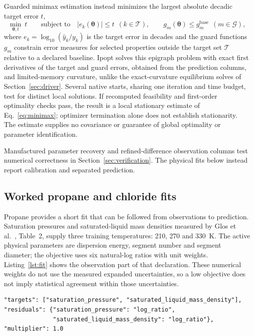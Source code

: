 Guarded minimax estimation instead minimizes the largest absolute decadic target error $t$,
\begin{equation}
\min_{\boldsymbol\theta,t}\ t\qquad\text{subject to}\quad \lvert e_k(\boldsymbol\theta)\rvert\le t\ \ (k\in\mathcal{T}),\qquad g_m(\boldsymbol\theta)\le g_m^{\mathrm{base}}\ \ (m\in\mathcal{G}),
\label{eq:minimax}
\end{equation}
where $e_k=\log_{10}(\hat y_k/y_k)$ is the target error in decades and the guard functions $g_m$ constrain error measures for selected properties outside the target set $\mathcal{T}$ relative to a declared baseline.
Ipopt solves this epigraph problem with exact first derivatives of the target and guard errors, obtained from the prediction columns, and limited-memory curvature, unlike the exact-curvature equilibrium solves of Section~\ref{sec:driver}.
Several native starts, sharing one iteration and time budget, test for distinct local solutions.
If recomputed feasibility and first-order optimality checks pass, the result is a local stationary estimate of Eq.~\eqref{eq:minimax}; optimizer termination alone does not establish stationarity.
The estimate supplies no covariance or guarantee of global optimality or parameter identification.

Manufactured parameter recovery and refined-difference observation columns test numerical correctness in Section~\ref{sec:verification}.
The physical fits below instead report calibration and separated prediction.




\subsection{Worked propane and chloride fits}
Propane provides a short fit that can be followed from observations to prediction.
Saturation pressures and saturated-liquid mass densities measured by Glos et al.~\citep{Glos2004}, Table~2, supply three training temperatures: 210, 270 and 330~K.
The active physical parameters are dispersion energy, segment number and segment diameter; the objective uses six natural-log ratios with unit weights.
Listing~\ref{lst:fit} shows the observation part of that declaration.
These numerical weights do not use the measured expanded uncertainties, so a low objective does not imply statistical agreement within those uncertainties.

\begin{lstlisting}[language={},caption={Observation excerpt of the propane fit declaration; the active physical coordinates are dispersion energy, segment count and diameter.},label={lst:fit}]
"targets": ["saturation_pressure", "saturated_liquid_mass_density"],
"residuals": {"saturation_pressure": "log_ratio",
              "saturated_liquid_mass_density": "log_ratio"},
"multiplier": 1.0
\end{lstlisting}

